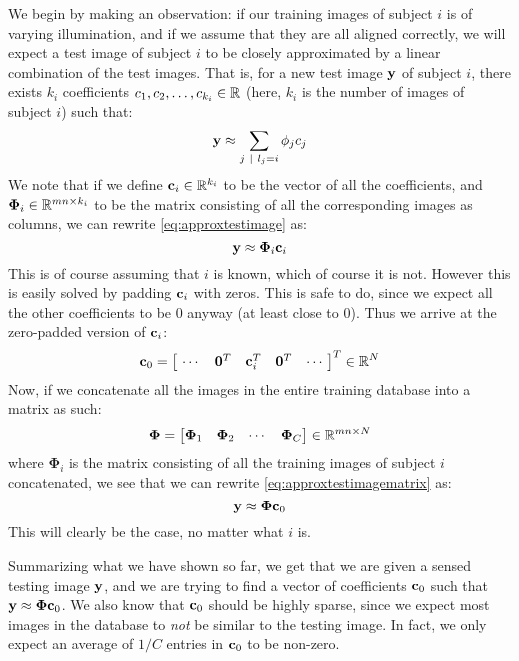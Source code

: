 We begin by making an observation: if our training images of subject $ i $ is of varying illumination, and if we assume that they are all aligned correctly, we will expect a test image of subject $ i $ to be closely approximated by a linear combination of the test images. That is, for a new test image $ \mathbf{y} $ of subject $ i $, there exists $ k_{i} $ coefficients $ c_{1}, c_{2}, \ldots, c_{k_{i}}  \in \mathbb{R} $ (here, $ k_{i} $ is the number of images of subject $ i $) such that:
\begin{equation}
	\label{eq:approxtestimage}
	\mathbf{y} \approx \sum_{j ~|~ l_{j} = i} \phi_{j}c_{j}
\end{equation}We note that if we define $ \mathbf{c}_{i} \in \mathbb{R}^{k_{i}} $ to be the vector of all the coefficients, and $ \mathbf{\Phi}_{i} \in \mathbb{R}^{mn \times k_{i}} $ to be the matrix consisting of all the corresponding images as columns, we can rewrite \eqref{eq:approxtestimage} as:
\begin{equation}
	\label{eq:approxtestimagematrix}
	\mathbf{y} \approx \mathbf{\Phi}_{i}\mathbf{c}_{i}
\end{equation}
This is of course assuming that $ i $ is known, which of course it is not. However this is easily solved by padding $ \mathbf{c}_i $ with zeros. This is safe to do, since we expect all the other coefficients to be $ 0 $ anyway (at least close to $ 0 $). Thus we arrive at the zero-padded version of $ \mathbf{c}_{i} $: 
\begin{equation*}
	\label{eq:c0def}
	\mathbf{c}_{0} = \begin{bmatrix}~\cdots & \mathbf{0}^{T} & \mathbf{c}_{i}^{T} & \mathbf{0}^{T} & \cdots~\end{bmatrix}^{T} \in \mathbb{R}^{N}
\end{equation*}
Now, if we concatenate all the images in the entire training database into a matrix as such:
\[
	\mathbf{\Phi} = \begin{bmatrix}\mathbf{\Phi}_{1} & \mathbf{\Phi}_{2} & \cdots & \mathbf{\Phi}_{C}\end{bmatrix} \in \mathbb{R}^{mn \times N}
\]
where $ \mathbf{\Phi}_{i} $ is the matrix consisting of all the training images of subject $ i $ concat\-enated, we see that we can rewrite \eqref{eq:approxtestimagematrix} as:
\begin{equation}
	\label{eq:approxtestimagefinal}
	\mathbf{y} \approx \mathbf{\Phi}\mathbf{c}_{0}
\end{equation}
This will clearly be the case, no matter what $ i $ is. 

Summarizing what we have shown so far, we get that we are given a sensed testing image $ \mathbf{y} $, and we are trying to find a vector of coefficients $ \mathbf{c}_{0} $ such that $ \mathbf{y} \approx \mathbf{\Phi}\mathbf{c}_{0} $. We also know that $ \mathbf{c}_{0} $ should be highly sparse, since we expect most images in the database to \textit{not} be similar to the testing image. In fact, we only expect an average of $ 1/C $ entries in $ \mathbf{c}_{0} $ to be non-zero. 


